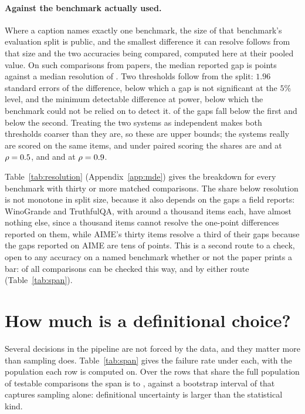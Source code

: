 \documentclass{article}
\begin{document}
\paragraph{Against the benchmark actually used.} Where a caption names exactly
one benchmark, the size of that benchmark's evaluation split is public, and the
smallest difference it can resolve follows from that size and the two
accuracies being compared, computed here at their pooled value. On \nResolutionComparisons{} such
comparisons from \nResolutionPapers{} papers, the median reported gap is
\nResolutionMedianGap{} points against a median resolution of
\nResolutionMedianRes{}. Two thresholds follow from the split: $1.96$
standard errors of the difference, below which a gap is not significant at
the $5\%$ level, and the minimum detectable difference at \nPowerLevel{}
power, below which the benchmark could not be relied on to detect it.
\nResolutionPctBelowSig{} of the gaps fall below the first and
\nResolutionPctBelow{} below the second. Treating the two systems as
independent makes both thresholds coarser than they are, so these are upper
bounds; the systems really are scored on the same items, and under paired
scoring the shares are \nResolutionPctBelowSigRhoHalf{} and
\nResolutionPctBelowRhoHalf{} at $\rho = 0.5{}$, and
\nResolutionPctBelowSigRhoNine{} and \nResolutionPctBelowRhoNine{} at
$\rho = 0.9{}$.

Table~\ref{tab:resolution} (Appendix~\ref{app:mde}) gives the breakdown for
every benchmark with thirty or more matched comparisons. The share below resolution is not monotone
in split size, because it also depends on the gaps a field reports: WinoGrande
and TruthfulQA, with around a thousand items each, have almost nothing else,
since a thousand items cannot resolve the one-point differences reported on
them, while AIME's thirty items resolve a third of their gaps because the gaps
reported on AIME are tens of points. This is a second route to a check,
open to any accuracy on a named benchmark whether or not the paper prints a
bar: \nCheckableItemRoute{} of all comparisons can be checked this way, and
\nCheckableUnion{} by either route (Table~\ref{tab:span}).

\section{How much is a definitional choice?}
\label{sec:sensitivity}

Several decisions in the pipeline are not forced by the data, and they matter
more than sampling does. Table~\ref{tab:span} gives the failure rate under each,
with the population each row is computed on. Over the rows that share the full
population of \nSpanN{} testable comparisons the span is \nSpanLow{} to
\nSpanHigh{}, against a bootstrap interval of \nCiFail{} that captures sampling
alone: definitional uncertainty is larger than the statistical kind.
\end{document}
